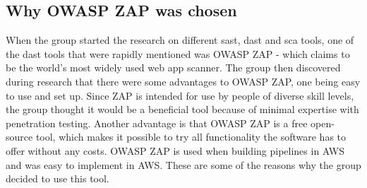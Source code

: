 \subsection{Why OWASP ZAP was chosen}
When the group started the research on different \acrshort{sast}, \acrshort{dast} and \acrshort{sca} tools, one of the \acrshort{dast} tools that were rapidly mentioned was OWASP ZAP - which claims to be the world's most widely used web app scanner. 
The group then discovered during research that there were some advantages to OWASP ZAP, one being easy to use and set up. Since ZAP is intended for use by people of diverse skill levels, the group thought it would be a beneficial tool because of minimal expertise with penetration testing. Another advantage is that OWASP ZAP is a free open-source tool, which makes it possible to try all functionality the software has to offer without any costs. OWASP ZAP is used when building pipelines in AWS and was easy to implement in AWS. These are some of the reasons why the group decided to use this tool. 

